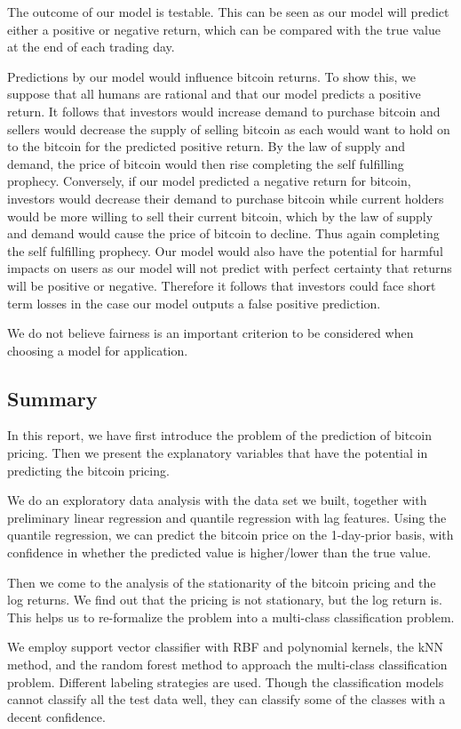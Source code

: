 \documentclass[9pt,twocolumn,twoside]{ilcss}
\begin{document}
The outcome of our model is testable. This can be seen as our model will predict either a positive or negative return, which can be compared with the true value at the end of each trading day.

Predictions by our model would influence bitcoin returns. To show this, we suppose that all humans are rational and that our model predicts a positive return. It follows that investors would increase demand to purchase bitcoin and sellers would decrease the supply of selling bitcoin as each would want to hold on to the bitcoin for the predicted positive return. By the law of supply and demand, the price of bitcoin would then rise completing the self fulfilling prophecy. Conversely, if our model predicted a negative return for bitcoin, investors would decrease their demand to purchase bitcoin while current holders would be more willing to sell their current bitcoin, which by the law of supply and demand would cause the price of bitcoin to decline. Thus again completing the self fulfilling prophecy.
Our model would also have the potential for harmful impacts on users as our model will not predict with perfect certainty that returns will be positive or negative. Therefore it follows that investors could face short term losses in the case our model outputs a false positive prediction.

We do not believe fairness is an important criterion to be considered when choosing a model for application.

\subsection*{Summary}
In this report, we have first introduce the problem of the prediction of bitcoin pricing. Then we present the explanatory variables that have the potential in predicting the bitcoin pricing.

We do an exploratory data analysis with the data set we built, together with preliminary linear regression and quantile regression with lag features. Using the quantile regression, we can predict the bitcoin price on the 1-day-prior basis, with confidence in whether the predicted value is higher/lower than the true value. 

Then we come to the analysis of the stationarity of the bitcoin pricing and the log returns. We find out that the pricing is not stationary, but the log return is. This helps us to re-formalize the problem into a multi-class classification problem. 

We employ support vector classifier with RBF and polynomial kernels, the kNN method, and the random forest method to approach the multi-class classification problem. Different labeling strategies are used. Though the classification models cannot classify all the test data well, they can classify some of the classes with a decent confidence.



\end{document}
